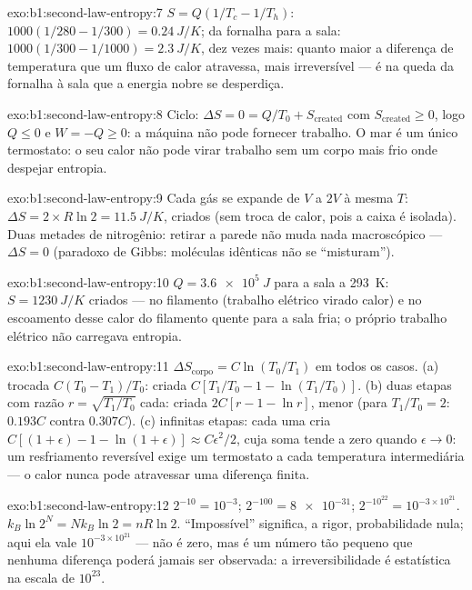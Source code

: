 \begin{solution}{exo:b1:second-law-entropy:7}
$S = Q(1/T_c - 1/T_h)$: $1000(1/280 - 1/300) = \qty{0.24}{J/K}$; da fornalha
para a sala: $1000(1/300 - 1/1000) = \qty{2.3}{J/K}$, dez vezes mais: quanto
maior a diferença de temperatura que um fluxo de calor atravessa, mais
irreversível --- é na queda da fornalha à sala que a energia nobre se desperdiça.
\end{solution}

\begin{solution}{exo:b1:second-law-entropy:8}
Ciclo: $\Delta S = 0 = Q/T_0 + S_{\mathrm{created}}$ com $S_{\mathrm{created}} \geq 0$,
logo $Q \leq 0$ e $W = -Q \geq 0$: a máquina não pode fornecer trabalho. O
mar é um único termostato: o seu calor não pode virar trabalho sem um
corpo mais frio onde despejar entropia.
\end{solution}

\begin{solution}{exo:b1:second-law-entropy:9}
Cada gás se expande de $V$ a $2V$ à mesma $T$: $\Delta S = 2 \times R\ln2
= \qty{11.5}{J/K}$, criados (sem troca de calor, pois a caixa é isolada). Duas
metades de nitrogênio: retirar a parede não muda nada macroscópico ---
$\Delta S = 0$ (paradoxo de Gibbs: moléculas idênticas não se ``misturam'').
\end{solution}

\begin{solution}{exo:b1:second-law-entropy:10}
$Q = \qty{3.6e5}{J}$ para a sala a \qty{293}{K}: $S = \qty{1230}{J/K}$
criados --- no filamento (trabalho elétrico virado calor) e no escoamento
desse calor do filamento quente para a sala fria; o próprio trabalho
elétrico não carregava entropia.
\end{solution}

\begin{solution}{exo:b1:second-law-entropy:11}
$\Delta S_{\text{corpo}} = C\ln(T_0/T_1)$ em todos os casos. (a) trocada
$C(T_0 - T_1)/T_0$: criada $C[T_1/T_0 - 1 - \ln(T_1/T_0)]$. (b) duas etapas
com razão $r = \sqrt{T_1/T_0}$ cada: criada $2C[r - 1 - \ln r]$, menor
(para $T_1/T_0 = 2$: $0.193C$ contra $0.307C$). (c) infinitas etapas:
cada uma cria $C[(1 + \epsilon) - 1 - \ln(1 + \epsilon)] \approx C\epsilon^2/2$,
cuja soma tende a zero quando $\epsilon \to 0$: um resfriamento reversível exige um termostato
a cada temperatura intermediária --- o calor nunca pode atravessar uma diferença finita.
\end{solution}

\begin{solution}{exo:b1:second-law-entropy:12}
$2^{-10} = 10^{-3}$; $2^{-100} = \num{8e-31}$; $2^{-10^{22}} = 10^{-3\times10^{21}}$.
$k_B\ln2^N = Nk_B\ln2 = nR\ln2$. ``Impossível'' significa, a rigor,
probabilidade nula; aqui ela vale $10^{-3\times10^{21}}$ --- não é zero, mas é um
número tão pequeno que nenhuma diferença poderá jamais ser observada: a
irreversibilidade é estatística na escala de $10^{23}$.
\end{solution}

